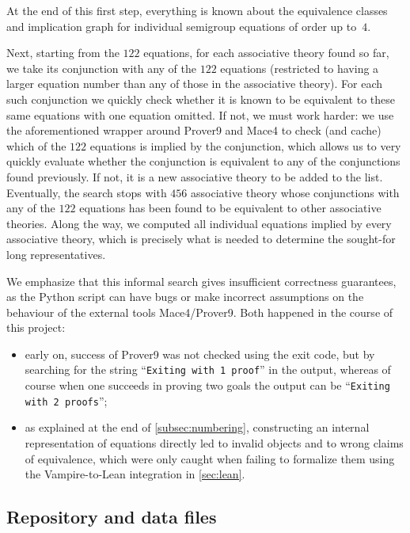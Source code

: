 \documentclass[12pt]{amsart}
\theoremstyle{plain}
\theoremstyle{definition}
\begin{document}
At the end of this first step, everything is known about the equivalence classes and implication graph for individual semigroup equations of order up to~$4$.

\medskip

Next, starting from the $122$ equations, for each associative theory found so far, we take its conjunction with any of the $122$ equations (restricted to having a larger equation number than any of those in the associative theory).  For each such conjunction we quickly check whether it is known to be equivalent to these same equations with one equation omitted.  If not, we must work harder: we use the aforementioned wrapper around Prover9 and Mace4 to check (and cache) which of the $122$ equations is implied by the conjunction, which allows us to very quickly evaluate whether the conjunction is equivalent to any of the conjunctions found previously.  If not, it is a new associative theory to be added to the list.
Eventually, the search stops with $456$ associative theory whose conjunctions with any of the $122$ equations has been found to be equivalent to other associative theories.  Along the way, we computed all individual equations implied by every associative theory, which is precisely what is needed to determine the sought-for long representatives.

We emphasize that this informal search gives insufficient correctness guarantees, as the Python script can have bugs or make incorrect assumptions on the behaviour of the external tools Mace4/Prover9.  Both happened in the course of this project:
\begin{itemize}
\item early on, success of Prover9 was not checked using the exit code, but by searching for the string ``\texttt{Exiting with 1 proof}'' in the output, whereas of course when one succeeds in proving two goals the output can be ``\texttt{Exiting with 2 proofs}'';
\item as explained at the end of \autoref{subsec:numbering}, constructing an internal representation of equations directly led to invalid objects and to wrong claims of equivalence, which were only caught when failing to formalize them using the Vampire-to-Lean integration in \autoref{sec:lean}.
\end{itemize}


\subsection{Repository and data files}
\label{subsec:repository}
\end{document}
